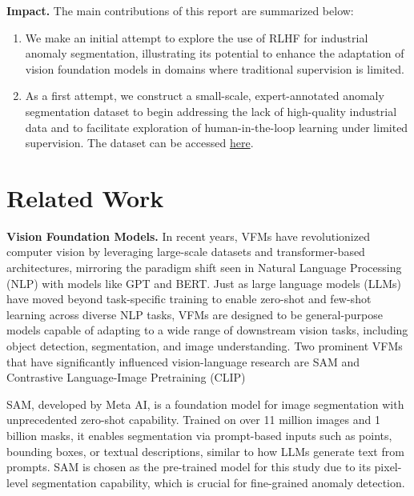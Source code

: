 \documentclass[11pt]{article}
\begin{document}
\textbf{Impact.} The main contributions of this report are summarized below:
\begin{enumerate}
    \item We make an initial attempt to explore the use of RLHF for industrial anomaly segmentation, illustrating its potential to enhance the adaptation of vision foundation models in domains where traditional supervision is limited.
    \item As a first attempt, we construct a small-scale, expert-annotated anomaly segmentation dataset to begin addressing the lack of high-quality industrial data and to facilitate exploration of human-in-the-loop learning under limited supervision. The dataset can be accessed \href{https://drive.google.com/file/d/1WrBl5hhJW4DL3Nobjv-YttYkrtiWpPJd/view?usp=sharing}{here}.
\end{enumerate}

    
\section{Related Work}
\textbf{Vision Foundation Models.} In recent years, VFMs have revolutionized computer vision by leveraging large-scale datasets and transformer-based architectures, mirroring the paradigm shift seen in Natural Language Processing (NLP) with models like GPT and BERT. Just as large language models (LLMs) have moved beyond task-specific training to enable zero-shot and few-shot learning across diverse NLP tasks, VFMs are designed to be general-purpose models capable of adapting to a wide range of downstream vision tasks, including object detection, segmentation, and image understanding. Two prominent VFMs that have significantly influenced vision-language research are SAM \cite{kirillov2023segment} and Contrastive Language-Image Pretraining (CLIP) \cite{radford2021learningtransferablevisualmodels}

SAM, developed by Meta AI, is a foundation model for image segmentation with unprecedented zero-shot capability. Trained on over 11 million images and 1 billion masks, it enables segmentation via prompt-based inputs such as points, bounding boxes, or textual descriptions, similar to how LLMs generate text from prompts. SAM is chosen as the pre-trained model for this study due to its pixel-level segmentation capability, which is crucial for fine-grained anomaly detection.
\end{document}
